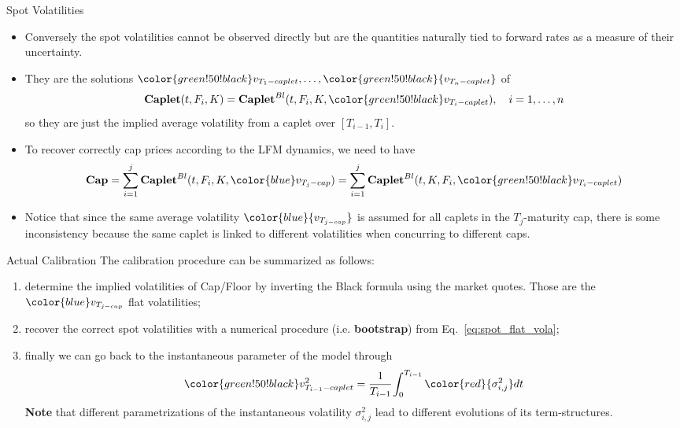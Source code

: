 \documentclass{beamer}
\begin{document}
\begin{frame}{Spot Volatilities}
	\begin{itemize}
		\item<1-> Conversely the \textcolor{green!50!black}{spot volatilities} cannot be observed directly but are the quantities \textcolor{maincolor}{naturally tied to forward rates as a measure of their uncertainty}.
		\item<1-> They are the solutions ${\color{green!50!black}v_{T_1-caplet}},\ldots, \color{green!50!black}{v_{T_n-caplet}}$ of
		\begin{equation*}
			\textbf{Caplet}(t,F_i,K) = \textbf{Caplet}^{Bl}(t, F_i, K,{\color{green!50!black}v_{T_i-caplet}}),\quad i=1, \ldots,n
		\end{equation*}
		so they are just the implied average volatility from a caplet over $[T_{i-1}, T_i]$.
		\item<2-> To recover correctly cap prices according to the LFM dynamics, we need to have
		\begin{equation}
			\textbf{Cap} = \sum_{i=1}^j\textbf{Caplet}^{Bl}(t,F_i, K,{\color{blue}v_{T_j-cap}}) = \sum_{i=1}^j\textbf{Caplet}^{Bl}(t,K,F_i,{\color{green!50!black}v_{T_i-caplet}})
		\label{eq:spot_flat_vola}
		\end{equation}
		\item<3-> Notice that since the same average volatility $\color{blue}{v_{T_{j-cap}}}$ is assumed for all caplets in the $T_j$-maturity cap, there is some inconsistency because the same caplet is linked to different volatilities when concurring to different caps.
	\end{itemize}
\end{frame}

\begin{frame}{Actual Calibration}
	The calibration procedure can be summarized as follows:
	\begin{enumerate}
		\item<1-> determine the implied volatilities of Cap/Floor by inverting the Black formula using the market quotes. Those are the ${\color{blue}v_{T_{j-cap}}}$ flat volatilities;
		\item<2-> recover the correct spot volatilities with a numerical procedure (i.e. \textbf{bootstrap}) from Eq.~\ref{eq:spot_flat_vola};
		\item<3-> finally we can go back to the instantaneous parameter of the model through
		\begin{equation}
			{\color{green!50!black}v_{T_{i-1}-caplet}^2} =\cfrac{1}{T_{i-1}} \int_0^{T_{i-1}}{\color{red}{\sigma^2_{i,j}}}dt %
		\end{equation}
		\textbf{Note} that different parametrizations of the instantaneous volatility $\sigma_{i,j}^2$ lead to different evolutions of its term-structures.
	\end{enumerate}
\end{frame}
\end{document}

